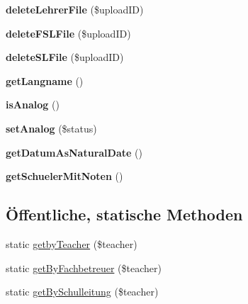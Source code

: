 \begin{DoxyCompactItemize}
{\bfseries delete\+Lehrer\+File} (\$upload\+ID)
\item 
\mbox{\label{class_leistungsnachweis_respizienz_ac11002f7e0edb003fa058eceb6b249ff}} 
{\bfseries delete\+F\+S\+L\+File} (\$upload\+ID)
\item 
\mbox{\label{class_leistungsnachweis_respizienz_a026adf2f13724e85edb895516da218b3}} 
{\bfseries delete\+S\+L\+File} (\$upload\+ID)
\item 
\mbox{\label{class_leistungsnachweis_respizienz_a26ebf8d67428f2f54195f99a268a414d}} 
{\bfseries get\+Langname} ()
\item 
\mbox{\label{class_leistungsnachweis_respizienz_a288c616b21aa17040405f4f3effd3e98}} 
{\bfseries is\+Analog} ()
\item 
\mbox{\label{class_leistungsnachweis_respizienz_a7eb0c6e7c96e38531f6161d5cc8f4c8a}} 
{\bfseries set\+Analog} (\$status)
\item 
\mbox{\label{class_leistungsnachweis_respizienz_a0352bab9d51495211d82f9f7732884f1}} 
{\bfseries get\+Datum\+As\+Natural\+Date} ()
\item 
\mbox{\label{class_leistungsnachweis_respizienz_ade1ca11ee65fc2da030a4ab5a44cb7b8}} 
{\bfseries get\+Schueler\+Mit\+Noten} ()
\end{DoxyCompactItemize}
\subsection*{Öffentliche, statische Methoden}
\begin{DoxyCompactItemize}
\item 
static \mbox{\hyperlink{class_leistungsnachweis_respizienz_a7bcfd3eb1016132ca9b69529efbb2260}{getby\+Teacher}} (\$teacher)
\item 
static \mbox{\hyperlink{class_leistungsnachweis_respizienz_a2de9e2c8bf04a72deeccff17712303a0}{get\+By\+Fachbetreuer}} (\$teacher)
\item 
static \mbox{\hyperlink{class_leistungsnachweis_respizienz_a3bbbec25b24084db198d29d55000ed50}{get\+By\+Schulleitung}} (\$teacher)
\end{DoxyCompactItemize}

